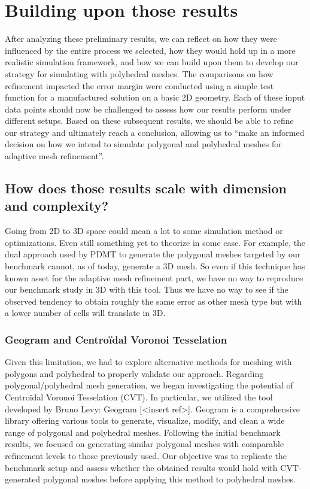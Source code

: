 \documentclass{article}
\begin{document}
\section{Building upon those results}
After analyzing these preliminary results, we can reflect on how they were influenced by the entire process we selected, how they would hold up in a more realistic simulation framework, and how we can build upon them to develop our strategy for simulating with polyhedral meshes. The comparisons on how refinement impacted the error margin were conducted using a simple test function for a manufactured solution on a basic 2D geometry. Each of these input data points should now be challenged to assess how our results perform under different setups. Based on these subsequent results, we should be able to refine our strategy and ultimately reach a conclusion, allowing us to ``make an informed decision on how we intend to simulate polygonal and polyhedral meshes for adaptive mesh refinement''.

\subsection{How does those results scale with dimension and complexity?}
Going from 2D to 3D space could mean a lot to some simulation method or optimizations. Even still something yet to theorize in some case. For example, the dual approach used by PDMT to generate the polygonal meshes targeted by our benchmark cannot, as of today, generate a 3D mesh. So even if this technique has known asset for the adaptive mesh refinement part, we have no way to reproduce our benchmark study in 3D with this tool. Thus we have no way to see if the observed tendency to obtain roughly the same error as other mesh type but with a lower number of cells will translate in 3D.

\subsubsection{Geogram and Centroïdal Voronoi Tesselation}
Given this limitation, we had to explore alternative methods for meshing with polygons and polyhedral to properly validate our approach. Regarding polygonal/polyhedral mesh generation, we began investigating the potential of Centroïdal Voronoi Tesselation (CVT). In particular, we utilized the tool developed by Bruno Levy: Geogram [<insert ref>]. Geogram is a comprehensive library offering various tools to generate, visualize, modify, and clean a wide range of polygonal and polyhedral meshes. Following the initial benchmark results, we focused on generating similar polygonal meshes with comparable refinement levels to those previously used. Our objective was to replicate the benchmark setup and assess whether the obtained results would hold with CVT-generated polygonal meshes before applying this method to polyhedral meshes.
\end{document}
